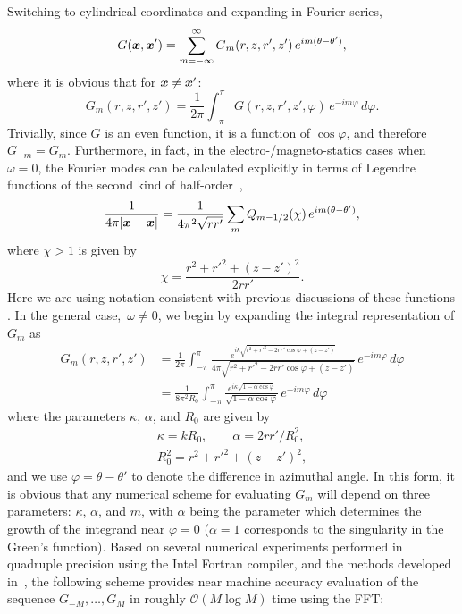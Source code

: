 \documentclass[11pt]{article}
\renewcommand{\phi}{\varphi}
\newcommand{\vct}{\vectorsym}
\newcommand{\bx}{\vct{ x}}
\newcommand\cO{\mathcal O}
\numberwithin{equation}{section}
\begin{document}
Switching to cylindrical coordinates and expanding in Fourier series,
\begin{equation}
  G(\bx,\bx') = \sum_{m=-\infty}^\infty G_m(r,z,r',z') \,
  e^{im(\theta-\theta')},
\end{equation}
where it is obvious that for $\bx \neq \bx'$:
\begin{equation}
G_m(r,z,r',z') = \frac{1}{2\pi} \int_{-\pi}^{\pi} G(r,z,r',z',\phi) \,
e^{-im\phi} \, d\phi.  
\end{equation}
Trivially, since $G$ is an even function, it is a function of
$\cos\phi$, and therefore
$G_{-m} = G_m$.
Furthermore, 
in fact, in the electro-/magneto-statics cases when $\omega=0$, the
Fourier modes can be calculated explicitly in terms of Legendre
functions of the second kind of half-order~\cite{cohl_1999,nist},
\begin{equation}\label{eq_qfuns}
  \frac{1}{4\pi| \bx - \bx |} = \frac{1}{4\pi^2 \sqrt{r r'}}
  \sum_m Q_{m-1/2}(\chi) \, e^{im(\theta-\theta')},
\end{equation}
where $\chi>1$ is given by
\begin{equation}
  \chi = \frac{r^2 + r'^2 + (z-z')^2 }{2rr'} .
\end{equation}
Here we are using notation consistent with previous discussions of
these functions \cite{cohl_1999,young}.
In the general case,~$\omega \neq 0$, we begin by 
expanding the integral representation of $G_m$ as
\begin{equation}\label{eq_gm}
\begin{aligned}
G_m(r,z,r',z') &= \frac{1}{2\pi} \int_{-\pi}^\pi 
\frac{e^{ik\sqrt{r^2 + r'^2 - 2rr' \cos\phi + (z-z')}}}
{4\pi \sqrt{r^2 + r'^2 - 2rr' \cos\phi + (z-z')}} \, e^{-im\phi} \,
d\phi \\
&= \frac{1}{8\pi^2 R_0} \int_{-\pi}^\pi 
\frac{e^{i\kappa\sqrt{1 - \alpha \cos\phi }}}
{ \sqrt{1 - \alpha \cos\phi }} \, e^{-im\phi} \,
d\phi
\end{aligned}
\end{equation}
where the parameters $\kappa$, $\alpha$, and $R_0$ are given by
\begin{equation}
\begin{gathered}
\kappa = k R_0, \qquad \alpha = 2rr'/R_0^2, \\
R_0^2 = r^2 + r'^2 + (z-z')^2,
\end{gathered}
\end{equation}
and we use $\phi = \theta-\theta'$ to denote the difference in
azimuthal angle.
In this form, it is obvious that any 
numerical scheme for evaluating $G_m$
will depend on three parameters: $\kappa$, $\alpha$, and $m$, with
$\alpha$ being the parameter which determines the growth of the
integrand near $\phi = 0$ 
($\alpha=1$ corresponds to the singularity in the Green's
function).
Based on several numerical experiments performed in quadruple
precision using the Intel Fortran compiler, and the methods developed
in~\cite{helsing_2014, young}, the following scheme provides near
machine accuracy evaluation of the sequence $G_{-M},\ldots,G_M$ in
roughly $\cO(M \log M)$ time using the FFT:
\end{document}
